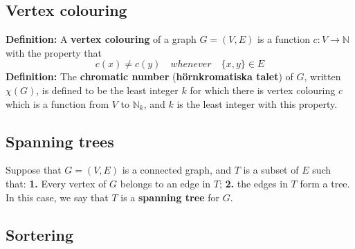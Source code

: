 \documentclass{article}
\begin{document}
\begin{multicols}{2}
\subsection{Vertex colouring}
\textbf{Definition:} A \textbf{vertex colouring} of a graph $G = (V,E)$ is a function $c: V \rightarrow \mathbb{N}$ with the property that $$c(x) \neq c(y) \quad whenever \quad \{x,y\} \in E$$
\newline
\textbf{Definition:} The \textbf{chromatic number} (\textbf{hörnkromatiska talet}) of $G$, written $\chi(G)$, is defined to be the least integer $k$ for which there is vertex colouring $c$ which is a function from $V$ to $\mathbb{N}_k$, and $k$ is the least integer with this property.\\
\subsection{Spanning trees}
Suppose that $G=(V,E)$ is a connected graph, and $T$ is a subset of $E$ such that: \textbf{1.} Every vertex of $G$ belongs to an edge in $T$; \textbf{2.} the edges in $T$ form a tree. In this case, we say that $T$ is a \textbf{spanning tree} for $G$.

\subsection{Sortering}

\end{multicols}
\end{document}
